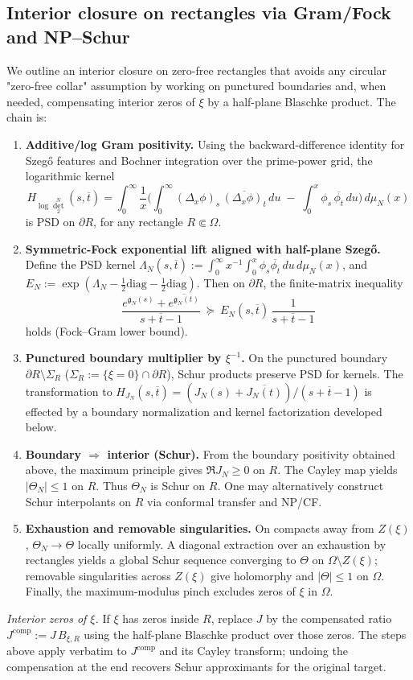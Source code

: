 \documentclass[11pt]{article}
\theoremstyle{definition}
\theoremstyle{remark}
\begin{document}
\subsection*{Interior closure on rectangles via Gram/Fock and NP--Schur}
We outline an interior closure on zero-free rectangles that avoids any circular "zero-free collar" assumption by working on punctured boundaries and, when needed, compensating interior zeros of \(\xi\) by a half-plane Blaschke product. The chain is:
\begin{enumerate}
  \item \textbf{Additive/log Gram positivity.} Using the backward-difference identity for Szeg\H{o} features and Bochner integration over the prime-power grid, the logarithmic kernel
  \[
    H_{\log\det_2^N}(s,\overline t)
    = \int_0^\infty \frac{1}{x}\Big(\int_0^\infty (\Delta_x\phi)_s\,\overline{(\Delta_x\phi)_t}\,du\; -\; \int_0^x \phi_s\,\overline{\phi_t}\,du\Big)\,d\mu_N(x)
  \]
  is PSD on \(\partial R\), for any rectangle \(R\Subset\Omega\).
  \item \textbf{Symmetric-Fock exponential lift aligned with half-plane Szeg\H{o}.} Define the PSD kernel
  \(\Lambda_N(s,\overline t):=\int_0^\infty x^{-1}\int_0^x \phi_s\overline{\phi_t}\,du\,d\mu_N(x)\), and
  \(E_N:=\exp(\Lambda_N-\tfrac12\mathrm{diag}-\tfrac12\mathrm{diag})\).
  Then on \(\partial R\), the finite-matrix inequality
  \[
    \frac{e^{\mathfrak g_N(s)}+\overline{e^{\mathfrak g_N(t)}}}{s+\overline t-1}\ \succeq\ E_N(s,\overline t)\,\frac{1}{s+\overline t-1}
  \]
  holds (Fock--Gram lower bound).
  \item \textbf{Punctured boundary multiplier by \(\xi^{-1}\).} On the punctured boundary \(\partial R\setminus\Sigma_R\) (\(\Sigma_R:=\{\xi=0\}\cap\partial R\)), Schur products preserve PSD for kernels. The transformation to \(H_{J_N}(s,\overline t)=(J_N(s)+\overline{J_N(t)})/(s+\overline t-1)\) is effected by a boundary normalization and kernel factorization developed below.
  \item \textbf{Boundary \(\Rightarrow\) interior (Schur).} From the boundary positivity obtained above, the maximum principle gives \(\Re J_N\ge 0\) on \(R\). The Cayley map yields \(|\Theta_N|\le 1\) on \(R\). Thus \(\Theta_N\) is Schur on \(R\). One may alternatively construct Schur interpolants on \(R\) via conformal transfer and NP/CF.
  \item \textbf{Exhaustion and removable singularities.} On compacts away from \(Z(\xi)\), \(\Theta_N\to\Theta\) locally uniformly. A diagonal extraction over an exhaustion by rectangles yields a global Schur sequence converging to \(\Theta\) on \(\Omega\setminus Z(\xi)\); removable singularities across \(Z(\xi)\) give holomorphy and \(|\Theta|\le 1\) on \(\Omega\). Finally, the maximum-modulus pinch excludes zeros of \(\xi\) in \(\Omega\).
\end{enumerate}
\noindent
\emph{Interior zeros of \(\xi\).} If \(\xi\) has zeros inside \(R\), replace \(J\) by the compensated ratio \(J^{\mathrm{comp}}:=J\,B_{\xi,R}\) using the half-plane Blaschke product over those zeros. The steps above apply verbatim to \(J^{\mathrm{comp}}\) and its Cayley transform; undoing the compensation at the end recovers Schur approximants for the original target.
\end{document}
